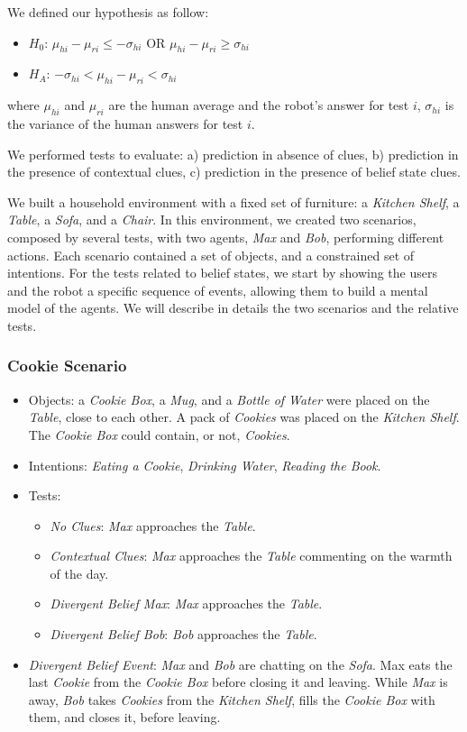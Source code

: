 We defined our hypothesis as follow: 
\begin{itemize}
\item $H_0$: $\mu_{hi}-\mu_{ri}\leq-\sigma_{hi}$ OR $\mu_{hi}-\mu_{ri}\geq\sigma_{hi}$ 
\item $H_A$: $-\sigma_{hi}<\mu_{hi}-\mu_{ri}<\sigma_{hi}$  
\end{itemize}
where $\mu_{hi}$ and $\mu_{ri}$ are the human average and the robot's answer for test $i$, $\sigma_{hi}$ is the variance of the human answers for test $i$.

We performed tests to evaluate: a) prediction in absence of clues, b) prediction in the presence of contextual clues, c) prediction in the presence of belief state clues.

We built a household environment with a fixed set of furniture: a \textit{Kitchen Shelf}, a \textit{Table}, a \textit{Sofa}, and a \textit{Chair}. In this environment, we created two scenarios, composed by several tests, with two agents, \textit{Max} and \textit{Bob}, performing different actions. Each scenario contained a set of objects, and a constrained set of intentions. For the tests related to belief states, we start by showing the users and the robot a specific sequence of events, allowing them to build a mental model of the agents. We will describe in details the two scenarios and the relative tests.

\subsubsection{Cookie Scenario}
\begin{itemize}
\item Objects: a \textit{Cookie Box}, a \textit{Mug}, and a \textit{Bottle of Water} were placed on the \textit{Table}, close to each other. A pack of \textit{Cookies} was placed on the \textit{Kitchen Shelf}. The \textit{Cookie Box} could contain, or not, \textit{Cookies}.
\item Intentions: \textit{Eating a Cookie}, \textit{Drinking Water}, \textit{Reading the Book}.
\item Tests:
\begin{itemize}
	\item \textit{No Clues}: \textit{Max} approaches the \textit{Table}.
    \item \textit{Contextual Clues}: \textit{Max} approaches the \textit{Table} commenting on the warmth of the day.
	\item \textit{Divergent Belief Max}: \textit{Max} approaches the \textit{Table}.
	\item \textit{Divergent Belief Bob}: \textit{Bob} approaches the \textit{Table}.
\end{itemize}
\item  \textit{Divergent Belief Event}:  \textit{Max} and \textit{Bob} are chatting on the \textit{Sofa}. Max eats the last \textit{Cookie} from the \textit{Cookie Box} before closing it and leaving. While \textit{Max} is away, \textit{Bob} takes \textit{Cookies} from the \textit{Kitchen Shelf}, fills the \textit{Cookie Box} with them, and closes it, before leaving.
\end{itemize}

